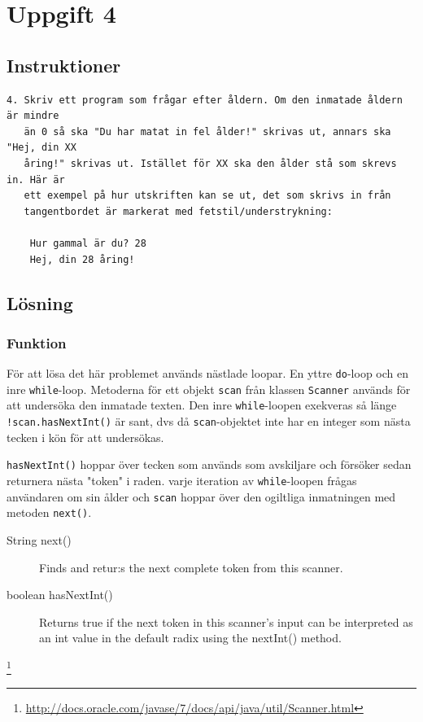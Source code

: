 \section{Uppgift 4}\label{uppgift-4}

\subsection{Instruktioner}
\begin{verbatim}
4. Skriv ett program som frågar efter åldern. Om den inmatade åldern är mindre
   än 0 så ska "Du har matat in fel ålder!" skrivas ut, annars ska "Hej, din XX
   åring!" skrivas ut. Istället för XX ska den ålder stå som skrevs in. Här är
   ett exempel på hur utskriften kan se ut, det som skrivs in från
   tangentbordet är markerat med fetstil/understrykning:

    Hur gammal är du? 28
    Hej, din 28 åring!
\end{verbatim}

\subsection{Lösning}
\subsubsection{Funktion}
För att lösa det här problemet används nästlade loopar. En yttre
\texttt{do}-loop och en inre \texttt{while}-loop.
Metoderna för ett objekt \texttt{scan} från klassen \texttt{Scanner} används
för att undersöka den inmatade texten. Den inre \texttt{while}-loopen exekveras
så länge \texttt{!scan.hasNextInt()} är sant, dvs då \texttt{scan}-objektet inte
har en integer som nästa tecken i kön för att undersökas.
\par \texttt{hasNextInt()} hoppar över tecken som används som avskiljare och
försöker sedan returnera nästa "token" i raden.
 varje iteration av \texttt{while}-loopen frågas användaren om sin ålder och
\texttt{scan} hoppar över den ogiltliga inmatningen med metoden \texttt{next()}.

\begin{description}
    \item[String next()] Finds and retur:s the next complete token from this scanner.
    \item [boolean hasNextInt()] Returns true if the next token in this scanner's input can be interpreted as an int value in the default radix using the nextInt() method.
        \footnotemark
\end{description}
\footnote{\url{http://docs.oracle.com/javase/7/docs/api/java/util/Scanner.html}}

